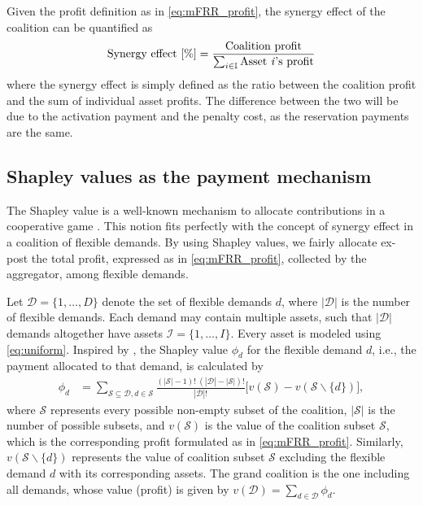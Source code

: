 \documentclass[conference]{IEEEtran}
\begin{document}
Given the profit definition as in \eqref{eq:mFRR_profit}, the synergy effect of the coalition can be quantified as
%
\begin{align}\label{eq:synergy_effect}
    \text{Synergy effect [\%]} = \frac{ \text{Coalition profit} }{ \sum_{i \in \mathbb{I}} \text{Asset \textit{i}'s profit} }
\end{align}
where the synergy effect is simply defined as the ratio between the coalition profit and the sum of individual asset profits. The difference between the two will be due to the activation payment and the penalty cost, as the reservation payments are the same.

\subsection{Shapley values as the payment mechanism}
%
The Shapley value is a well-known mechanism to allocate contributions in a cooperative game \cite{shapley1997value}. This notion fits perfectly with the concept of synergy effect in a coalition of flexible demands. By using Shapley values, we fairly allocate ex-post the total profit, expressed as in \eqref{eq:mFRR_profit}, collected by the aggregator, among flexible demands.



Let $\mathcal{D}=\{1, \hdots, D \}$ denote the set of flexible demands $d$, where $|\mathcal{D}|$ is the number of flexible demands. Each demand may contain multiple assets, such that $|\mathcal{D}|$ demands altogether have assets $\mathcal{I}=\{1, \hdots, I \}$. Every asset is modeled using \eqref{eq:uniform}.
%
Inspired by \cite{shapley1997value}, the Shapley value $\phi_d$  for the flexible demand $d$, i.e., the payment allocated to that demand, is calculated by
%
\begin{align}\label{eq:shap}
    \phi_d & = \sum_{\mathcal{S} \subseteq \mathcal{D}, d \in \mathcal{S}} \frac{(|\mathcal{S}|-1)! \ (|\mathcal{D}|-|\mathcal{S}|)!}{|\mathcal{D}|!}\Big[v(\mathcal{S})-v(\mathcal{S} \backslash\{d\})\Big],
\end{align}
%
where $\mathcal{S}$ represents every possible non-empty subset of the coalition, $|\mathcal{S}|$ is the number of possible subsets,  and $v(\mathcal{S})$ is the value of the coalition subset $\mathcal{S}$, which is the corresponding profit formulated as in \eqref{eq:mFRR_profit}. Similarly, $v(\mathcal{S} \backslash\{d\})$ represents the value of coalition subset $\mathcal{S}$ excluding the flexible demand $d$ with its corresponding assets. The grand coalition is the one including all demands, whose value (profit) is given by $v(\mathcal{D}) = \sum_{d \in \mathcal{D}} \phi_{d}$.
\end{document}
